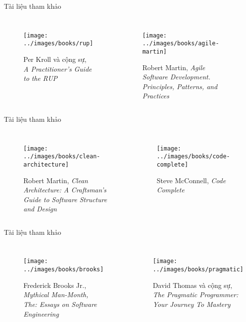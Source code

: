 \documentclass{beamer}
\begin{document}
\begin{frame}{Tài liệu tham khảo}
    \begin{columns}
        \begin{figure}
            \centering
            \texttt{[image: ../images/books/rup]}
            \caption{Per Kroll và cộng sự, \emph{A Practitioner's Guide to the RUP}}
        \end{figure}
        \begin{figure}
            \centering
            \texttt{[image: ../images/books/agile-martin]}
            \caption{Robert Martin,
            \emph{Agile Software Development. Principles, Patterns, and Practices}}
        \end{figure}
    \end{columns}
\end{frame}

\begin{frame}{Tài liệu tham khảo}
    \begin{columns}
        \begin{figure}
            \centering
            \texttt{[image: ../images/books/clean-architecture]}
            \caption{Robert Martin, \emph{Clean Architecture: A Craftsman's Guide to Software Structure and Design}}
        \end{figure}
        \begin{figure}
            \centering
            \texttt{[image: ../images/books/code-complete]}
            \caption{Steve McConnell, \emph{Code Complete}}
        \end{figure}
    \end{columns}
\end{frame}

\begin{frame}{Tài liệu tham khảo}
    \begin{columns}
        \begin{figure}
            \centering
            \texttt{[image: ../images/books/brooks]}
            \caption{Frederick Brooks Jr., \emph{Mythical Man-Month, The: Essays on Software Engineering}}
        \end{figure}
        \begin{figure}
            \centering
            \texttt{[image: ../images/books/pragmatic]}
            \caption{David Thomas và cộng sự, \emph{The Pragmatic Programmer: Your Journey To Mastery}}
        \end{figure}
    \end{columns}
\end{frame}
\end{document}
